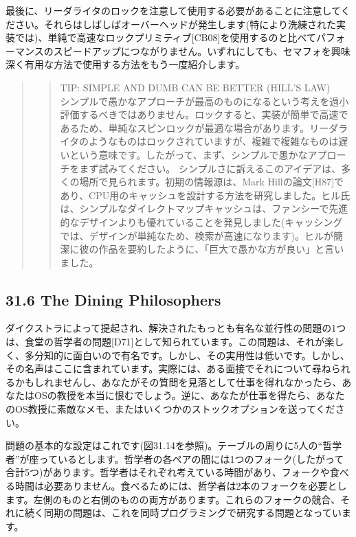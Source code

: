 最後に、リーダライタのロックを注意して使用する必要があることに注意してください。それらはしばしばオーバーヘッドが発生します(特により洗練された実装では)、単純で高速なロックプリミティブ{[}CB08{]}を使用するのと比べてパフォーマンスのスピードアップにつながりません。いずれにしても、セマフォを興味深く有用な方法で使用する方法をもう一度紹介します。

\begin{quote}
\begin{quote}
TIP: SIMPLE AND DUMB CAN BE BETTER (HILL'S LAW)\\
シンプルで愚かなアプローチが最高のものになるという考えを過小評価するべきではありません。ロックすると、実装が簡単で高速であるため、単純なスピンロックが最適な場合があります。リーダライタのようなものはロックされていますが、複雑で複雑なものは遅いという意味です。したがって、まず、シンプルで愚かなアプローチをまず試みてください。
シンプルさに訴えるこのアイデアは、多くの場所で見られます。初期の情報源は、Mark
Hillの論文{[}H87{]}であり、CPU用のキャッシュを設計する方法を研究しました。ヒル氏は、シンプルなダイレクトマップキャッシュは、ファンシーで先進的なデザインよりも優れていることを発見しました(キャッシングでは、デザインが単純なため、検索が高速になります)。ヒルが簡潔に彼の作品を要約したように、「巨大で愚かな方が良い」と言いました。
\end{quote}
\end{quote}

\hypertarget{the-dining-philosophers}{%
\subsection*{31.6 The Dining
Philosophers}\label{the-dining-philosophers}}

ダイクストラによって提起され、解決されたもっとも有名な並行性の問題の1つは、食堂の哲学者の問題{[}D71{]}として知られています。この問題は、それが楽しく、多分知的に面白いので有名です。しかし、その実用性は低いです。しかし、その名声はここに含まれています。実際には、ある面接でそれについて尋ねられるかもしれませんし、あなたがその質問を見落として仕事を得れなかったら、あなたはOSの教授を本当に恨むでしょう。逆に、あなたが仕事を得たら、あなたのOS教授に素敵なメモ、またはいくつかのストックオプションを送ってください。

問題の基本的な設定はこれです(図31.14を参照)。テーブルの周りに5人の``哲学者''が座っているとします。哲学者の各ペアの間には1つのフォーク(したがって合計5つ)があります。哲学者はそれぞれ考えている時間があり、フォークや食べる時間は必要ありません。食べるためには、哲学者は2本のフォークを必要とします。左側のものと右側のものの両方があります。これらのフォークの競合、それに続く同期の問題は、これを同時プログラミングで研究する問題となっています。

